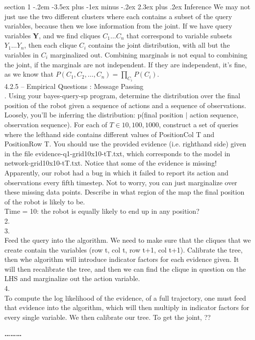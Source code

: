 \documentclass[12pt]{article}
\makeatletter
\newenvironment{problem}{\@startsection
       {section}
       {1}
       {-.2em}
       {-3.5ex plus -1ex minus -.2ex}
       {2.3ex plus .2ex}
       {\pagebreak[3]%
       \large\bf\noindent{Problem }
       }
       }
       {%
       \begin{center}\large\bf \ldots\ldots\ldots\end{center}}
\makeatother
\begin{document}
\begin{problem}{Inference}
We may not just use the two different clusters where each contains a subset of the query variables, because then we lose information from the joint.  If we have query variables $\textbf{Y}$, and we find cliques $C_1 \ldots C_n$ that correspond to variable subsets $Y_1 \ldots Y_n$, then each clique $C_i$ contains the joint distribution, with all but the variables in $C_i$ marginalized out.  Combining marginals is not equal to combining the joint, if the marginals are not independent.  If they are independent, it's fine, as we know that $P(C_1,C_2,\ldots,C_n) = \prod_{C_i} P(C_i)$.\\

4.2.5 -- Empirical Questions : Message Passing\\

. Using your bayes-query-sp program, determine the distribution over the final position of the robot given a sequence of actions and a sequence of observations. Loosely, you'll be inferring the distribution: p(final position $\mid$ action sequence, observation sequence). For each of $T \in {10,100,1000}$, construct a set of queries where the lefthand side contains different values of PositionCol T and PositionRow T. You should use the provided evidence (i.e. righthand side) given in the file evidence-q1-grid10x10-tT.txt, which corresponds to the model in network-grid10x10-tT.txt. Notice that some of the evidence is missing! Apparently, our robot had a bug in which it failed to report its action and observations every fifth timestep. Not to worry, you can just marginalize over these missing data points. Describe in what region of the map the final position of the robot is likely to be.\\
Time = 10: the robot is equally likely to end up in any position?\\

2.\\

3.\\

Feed the query into the algorithm.  We need to make sure that the cliques that we create contain the variables (row t, col t, row t+1, col t+1).  Calibrate the tree, then whe algorithm will introduce indicator factors for each evidence given.  It will then recalibrate the tree, and then we can find the clique in question on the LHS and marginalize out the action variable.\\

4.\\
To compute the log likelihood of the evidence, of a full trajectory, one must feed that evidence into the algorithm, which will then multiply in indicator factors for every single variable.  We then calibrate our tree.  To get the joint, ?? \\


\end{problem}
\end{document}
